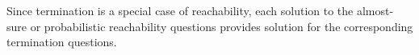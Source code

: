 Since termination is a special case of reachability, each solution to the 
almost-sure or probabilistic reachability questions provides solution for the 
corresponding termination questions.
%
%
